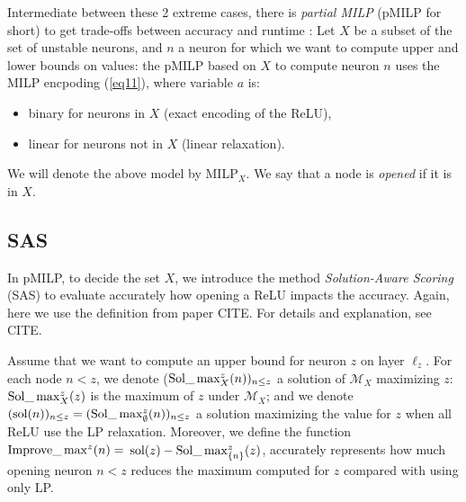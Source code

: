 	
	
	Intermediate between these 2 extreme cases, there is {\em partial MILP} 
    (pMILP for short) to get trade-offs between accuracy and runtime
	\cite{DivideAndSlide}:
	Let $X$ be a subset of the set of unstable neurons, and $n$ a neuron for which we want to compute upper and lower bounds on values: the pMILP based on $X$ to compute neuron $n$ uses the MILP encpoding (\ref{eq11}), where variable $a$ is:
	\begin{itemize}
		\item binary for neurons in $X$ (exact encoding of the ReLU),
		\item linear for neurons not in $X$ (linear relaxation).
	\end{itemize}
	We will denote the above model by MILP$_X$. We say that a node is {\em opened} if it is in $X$. 
	
	
	\iffalse
	\subsection{SAS}
	
	
	In pMILP, to decide the set $X$, we introduce the method {\em Solution-Aware Scoring} (SAS)
	to evaluate accurately how opening a ReLU impacts the accuracy. Again, here we use the definition from paper CITE. For details and explanation, see CITE.
	
	
	Assume that we want to compute an upper bound for neuron $z$ on layer $\ell_z$. For each node $n<z$, we denote ($\mathrm{Sol}\_\max_X^z(n))_{n \leq z}$ a solution of $\mathcal{M}_X$ maximizing $z$: $\mathrm{Sol}\_\max_X^z(z)$ is the maximum of $z$ under $\mathcal{M}_X$; and we denote $(\mathrm{sol}(n))_{n \leq z} = (\mathrm{Sol}\_\max_\emptyset^z(n))_{n \leq z}$ a solution maximizing the value for $z$ when all ReLU use the LP relaxation. Moreover,  we define the function
	$\mathrm{Improve}\_\max^z(n)=$ $\mathrm{sol}(z) - \mathrm{Sol}\_\max_{\{n\}}^z(z)$, 
	accurately represents how much opening neuron $n < z$ reduces the maximum computed for $z$
	compared with using only LP. 
	
